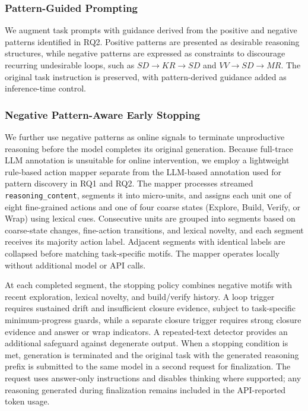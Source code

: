 \documentclass[acmsmall,screen,review,anonymous]{acmart}
\begin{document}
\subsubsection{\textbf{Pattern-Guided Prompting}}
We augment task prompts with guidance derived from the positive and negative patterns identified in RQ2. Positive patterns are presented as desirable reasoning structures, while negative patterns are expressed as constraints to discourage recurring undesirable loops, such as \(SD{\rightarrow}KR{\rightarrow}SD\) and \(VV{\rightarrow}SD{\rightarrow}MR\). The original task instruction is preserved, with pattern-derived guidance added as inference-time control.

\subsubsection{\textbf{Negative Pattern-Aware Early Stopping}}

We further use negative patterns as online signals to terminate unproductive reasoning before the model completes its original generation. Because full-trace LLM annotation is unsuitable for online intervention, we employ a lightweight rule-based action mapper separate from the LLM-based annotation used for pattern discovery in RQ1 and RQ2. The mapper processes streamed \texttt{reasoning\_content}, segments it into micro-units, and assigns each unit one of eight fine-grained actions and one of four coarse states (Explore, Build, Verify, or Wrap) using lexical cues. Consecutive units are grouped into segments based on coarse-state changes, fine-action transitions, and lexical novelty, and each segment receives its majority action label. Adjacent segments with identical labels are collapsed before matching task-specific motifs. The mapper operates locally without additional model or API calls.

At each completed segment, the stopping policy combines negative motifs with recent exploration, lexical novelty, and build/verify history. A loop trigger requires sustained drift and insufficient closure evidence, subject to task-specific minimum-progress guards, while a separate closure trigger requires strong closure evidence and answer or wrap indicators. A repeated-text detector provides an additional safeguard against degenerate output. When a stopping condition is met, generation is terminated and the original task with the generated reasoning prefix is submitted to the same model in a second request for finalization. The request uses answer-only instructions and disables thinking where supported; any reasoning generated during finalization remains included in the API-reported token usage.
\end{document}
